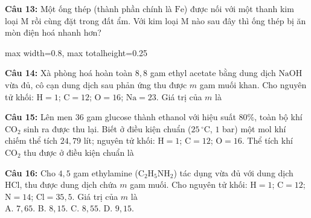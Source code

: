 \documentclass[12pt,a4paper]{article}
\begin{document}
\noindent \textbf{Câu 13:} Một ống thép (thành phần chính là $\text{Fe}$) được nối với một thanh kim loại M rồi cùng đặt trong đất ẩm. Với kim loại M nào sau đây thì ống thép bị ăn mòn điện hoá nhanh hơn?\\
\begin{center}
\begin{adjustbox}{max width=0.8\linewidth, max totalheight=0.25\textheight}
\end{adjustbox}
\end{center}
\noindent{}

\noindent \textbf{Câu 14:} Xà phòng hoá hoàn toàn $8{,}8$ gam ethyl acetate bằng dung dịch $\text{NaOH}$ vừa đủ, cô cạn dung dịch sau phản ứng thu được $m$ gam muối khan. Cho nguyên tử khối: $\text{H} = 1$; $\text{C} = 12$; $\text{O} = 16$; $\text{Na} = 23$. Giá trị của $m$ là\\
\noindent{}

\noindent \textbf{Câu 15:} Lên men $36$ gam glucose thành ethanol với hiệu suất $80\%$, toàn bộ khí $\text{CO}_2$ sinh ra được thu lại. Biết ở điều kiện chuẩn ($25\,^{\circ}\text{C}$, $1$ bar) một mol khí chiếm thể tích $24{,}79$ lít; nguyên tử khối: $\text{H} = 1$; $\text{C} = 12$; $\text{O} = 16$. Thể tích khí $\text{CO}_2$ thu được ở điều kiện chuẩn là\\
\noindent{}

\noindent \textbf{Câu 16:} Cho $4{,}5$ gam ethylamine ($\text{C}_2\text{H}_5\text{NH}_2$) tác dụng vừa đủ với dung dịch $\text{HCl}$, thu được dung dịch chứa $m$ gam muối. Cho nguyên tử khối: $\text{H} = 1$; $\text{C} = 12$; $\text{N} = 14$; $\text{Cl} = 35{,}5$. Giá trị của $m$ là\\
\noindent A. $7{,}65$. \hfill B. $8{,}15$. \hfill C. $8{,}55$. \hfill D. $9{,}15$.\\
\end{document}
